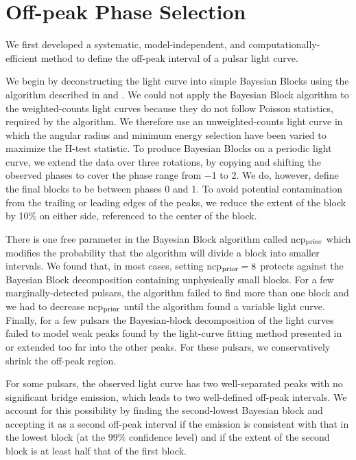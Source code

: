 \section{Off-peak Phase Selection}

We first developed a systematic, model-independent, and
computationally-efficient method to define the off-peak interval of a
pulsar light curve.

We begin by deconstructing the light curve into simple Bayesian Blocks
using the algorithm described in \citet{jackson_2005a_algorithm-optimal}
and \citet{scargle_2013a_studies-astronomical}.  We could not apply the
Bayesian Block algorithm to the weighted-counts light curves because
they do not follow Poisson statistics, required by the algorithm.
We therefore use an unweighted-counts light curve in which the angular
radius and minimum energy selection have been varied to maximize the
H-test statistic.  To produce Bayesian Blocks on a periodic light curve,
we extend the data over three rotations, by copying and shifting the
observed phases to cover the phase range from $-$1 to 2.  We do, however,
define the final blocks to be between phases 0 and 1.  To avoid potential
contamination from the trailing or leading edges of the peaks, we reduce
the extent of the block by 10\% on either side, referenced to the center
of the block.

There is one free parameter in the Bayesian Block algorithm called ncp$\rm
_{prior}$ which modifies the probability that the algorithm will divide
a block into smaller intervals.  We found that, in most cases, setting
ncp$\rm _{prior}=8$ protects against the Bayesian Block decomposition
containing unphysically small blocks.  For a few marginally-detected
pulsars, the algorithm failed to find more than one block and we had to
decrease ncp$\rm _{prior}$ until the algorithm found a variable light
curve. Finally, for a few pulsars the Bayesian-block decomposition of the
light curves failed to model weak peaks found by the light-curve fitting
method presented in \citep{abdo_2013a_second-fermi} or extended too far
into the other peaks. For these pulsars, we conservatively shrink the
off-peak region.

For some pulsars, the observed light curve has two well-separated peaks
with no significant bridge emission, which leads to two well-defined
off-peak intervals.  We account for this possibility by finding the
second-lowest Bayesian block and accepting it as a second off-peak
interval if the emission is consistent with that in the lowest block
(at the 99\% confidence level) and if the extent of the second block is
at least half that of the first block.

